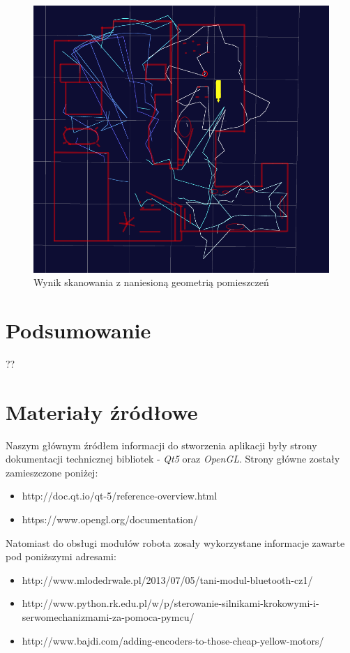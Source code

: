 \documentclass[a4paper]{article}
\begin{document}
\begin{figure}[p]
\centering
\includegraphics[width=\linewidth]{stancjad.png}
\caption{Wynik skanowania z naniesioną geometrią pomieszczeń}
\label{stancjad}
\end{figure}

\section{Podsumowanie}
??

\section{Materiały źródłowe}

Naszym głównym źródłem informacji do stworzenia aplikacji były strony dokumentacji technicznej bibliotek - \textit{Qt5} oraz \textit{OpenGL}. Strony główne zostały zamieszczone poniżej:

\begin{itemize}
\item http://doc.qt.io/qt-5/reference-overview.html
\item https://www.opengl.org/documentation/
\end{itemize}

Natomiast do obsługi modułów robota zosały wykorzystane informacje zawarte pod poniższymi adresami:

\begin{itemize}
\item http://www.mlodedrwale.pl/2013/07/05/tani-modul-bluetooth-cz1/
\item http://www.python.rk.edu.pl/w/p/sterowanie-silnikami-krokowymi-i-serwomechanizmami-za-pomoca-pymcu/
\item http://www.bajdi.com/adding-encoders-to-those-cheap-yellow-motors/
\end{itemize}
\end{document}
